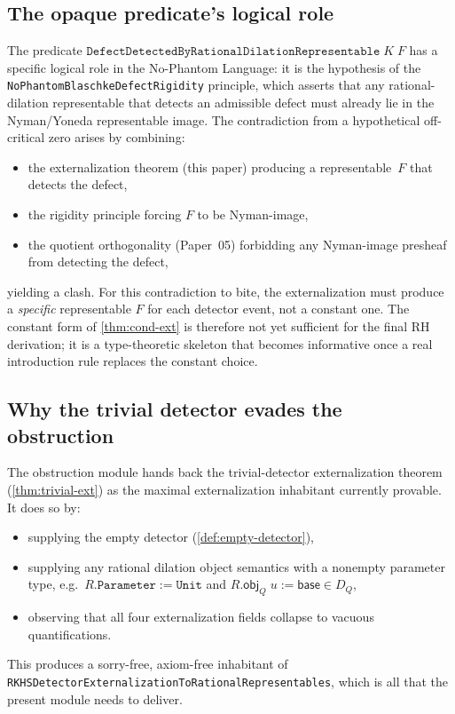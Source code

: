 \documentclass[12pt]{article}
\theoremstyle{plain}
\theoremstyle{definition}
\theoremstyle{remark}
\newcommand{\DQ}{D_{Q}}
\newcommand{\objQ}{\mathsf{obj}_{Q}}
\begin{document}
\subsection{The opaque predicate's logical role}

The predicate
$\texttt{DefectDetectedByRationalDilationRepresentable}\;K\;F$ has a
specific logical role in the No-Phantom Language: it is the
hypothesis of the \texttt{NoPhantomBlaschkeDefectRigidity} principle,
which asserts that any rational-dilation representable that detects
an admissible defect must already lie in the Nyman/Yoneda
representable image.  The contradiction from a hypothetical
off-critical zero arises by combining:
\begin{itemize}
  \item the externalization theorem (this paper) producing a
    representable~$F$ that detects the defect,
  \item the rigidity principle forcing $F$ to be Nyman-image,
  \item the quotient orthogonality (Paper~05) forbidding any
    Nyman-image presheaf from detecting the defect,
\end{itemize}
yielding a clash.  For this contradiction to bite, the externalization
must produce a \emph{specific} representable $F$ for each detector
event, not a constant one.  The constant form of \cref{thm:cond-ext}
is therefore not yet sufficient for the final RH derivation; it is a
type-theoretic skeleton that becomes informative once a real
introduction rule replaces the constant choice.

\subsection{Why the trivial detector evades the obstruction}

The obstruction module hands back the trivial-detector externalization
theorem (\cref{thm:trivial-ext}) as the maximal externalization
inhabitant currently provable.  It does so by:
\begin{itemize}
  \item supplying the empty detector (\cref{def:empty-detector}),
  \item supplying any rational dilation object semantics with a
    nonempty parameter type, e.g.\
    $R.\texttt{Parameter}:= \texttt{Unit}$ and
    $R.\objQ\;u := \mathsf{base}\in\DQ$,
  \item observing that all four externalization fields collapse to
    vacuous quantifications.
\end{itemize}
This produces a sorry-free, axiom-free inhabitant of
\texttt{RKHSDetectorExternalizationToRationalRepresentables}, which is
all that the present module needs to deliver.
\end{document}

